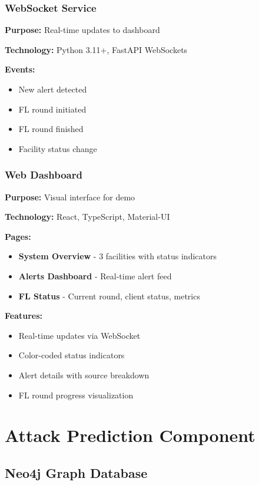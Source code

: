 \documentclass[12pt,a4paper]{article}
\begin{document}
\subsubsection{WebSocket Service}

\textbf{Purpose:} Real-time updates to dashboard

\textbf{Technology:} Python 3.11+, FastAPI WebSockets

\textbf{Events:}
\begin{itemize}[leftmargin=1cm,itemsep=0pt]
    \item New alert detected
    \item FL round initiated
    \item FL round finished
    \item Facility status change
\end{itemize}

\subsubsection{Web Dashboard}

\textbf{Purpose:} Visual interface for demo

\textbf{Technology:} React, TypeScript, Material-UI

\textbf{Pages:}
\begin{itemize}[leftmargin=1cm,itemsep=0pt]
    \item \textbf{System Overview} - 3 facilities with status indicators
    \item \textbf{Alerts Dashboard} - Real-time alert feed
    \item \textbf{FL Status} - Current round, client status, metrics
\end{itemize}

\textbf{Features:}
\begin{itemize}[leftmargin=1cm,itemsep=0pt]
    \item Real-time updates via WebSocket
    \item Color-coded status indicators
    \item Alert details with source breakdown
    \item FL round progress visualization
\end{itemize}


\section{Attack Prediction Component}

\subsection{Neo4j Graph Database}
\end{document}
